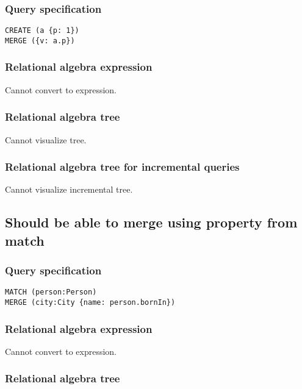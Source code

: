 \subsubsection*{Query specification}

\begin{lstlisting}
CREATE (a {p: 1})
MERGE ({v: a.p})
\end{lstlisting}

\subsubsection*{Relational algebra expression}

Cannot convert to expression.

\subsubsection*{Relational algebra tree}

Cannot visualize tree.

\subsubsection*{Relational algebra tree for incremental queries}

Cannot visualize incremental tree.

\subsection{Should be able to merge using property from match}

\subsubsection*{Query specification}

\begin{lstlisting}
MATCH (person:Person)
MERGE (city:City {name: person.bornIn})
\end{lstlisting}

\subsubsection*{Relational algebra expression}

Cannot convert to expression.

\subsubsection*{Relational algebra tree}

